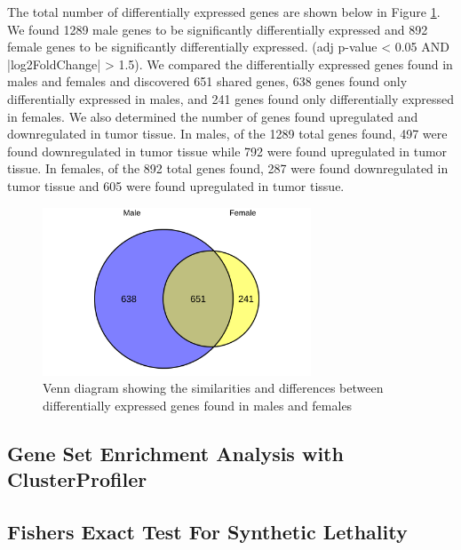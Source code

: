 \documentclass[10pt]{article}
\providecommand{\figref}[1]{Figure \ref{#1}}  %
\begin{document}
	The total number of differentially expressed genes are shown below in \figref{fig:6}. We found 1289 male genes to be significantly differentially expressed and 892 female genes to be significantly differentially expressed. (adj p-value < 0.05 AND |log2FoldChange| > 1.5). We compared the differentially expressed genes found in males and females and discovered 651 shared genes, 638 genes found only differentially expressed in males, and 241 genes found only differentially expressed in females. We also determined the number of genes found upregulated and downregulated in tumor tissue. In males, of the 1289 total genes found, 497 were found downregulated in tumor tissue while 792 were found upregulated in tumor tissue. In females, of the 892 total genes found, 287 were found downregulated in tumor tissue and 605 were found upregulated in tumor tissue.
	
	\begin{figure}[!h]
		\centering
		\includegraphics[width=8cm, height=5cm]{all_cancersvenndiagram_malede_vs_femalede_0.9.png}
		\caption{Venn diagram showing the similarities and differences between differentially expressed genes found in males and females}
		\label{fig:6}
	\end{figure}
	
	\subsection{Gene Set Enrichment Analysis with ClusterProfiler}
	
	

	\subsection{Fishers Exact Test For Synthetic Lethality}
\end{document}
